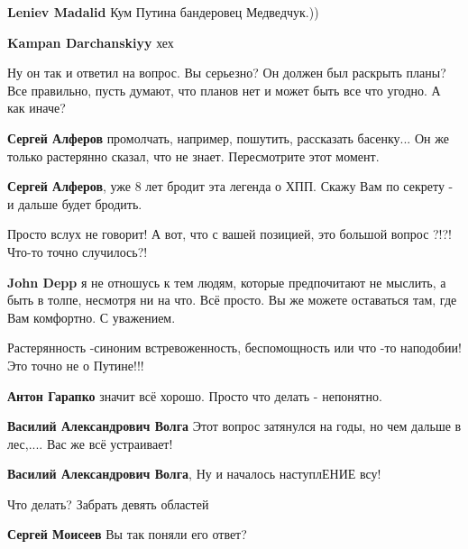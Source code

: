 \begin{itemize}
\begin{itemize} %
\textbf{Leniev Madalid} Кум Путина бандеровец Медведчук.))

\textbf{Kampan Darchanskiyy} хех
\end{itemize} %


Ну он так и ответил на вопрос. Вы серьезно? Он должен был раскрыть планы? Все
правильно, пусть думают, что планов нет и может быть все что угодно. А как
иначе?

\begin{itemize} %
\textbf{Сергей Алферов} промолчать, например, пошутить, рассказать басенку... Он же только растерянно сказал, что не знает. Пересмотрите этот момент.

\textbf{Сергей Алферов}, уже 8 лет бродит эта легенда о ХПП. Скажу Вам по секрету - и дальше будет бродить.
\end{itemize} %


Просто вслух не говорит! А вот, что с вашей позицией, это большой вопрос ?!?!
Что-то точно случилось?!

\begin{itemize} %
\textbf{John Depp} я не отношусь к тем людям, которые предпочитают не мыслить, а быть в толпе, несмотря ни на что. Всё просто. Вы же можете оставаться там, где Вам комфортно.
С уважением.
\end{itemize} %


Растерянность -синоним встревоженность, беспомощность или что -то наподобии!
Это точно не о Путине!!!

\begin{itemize} %
\textbf{Антон Гарапко} значит всё хорошо. Просто что делать - непонятно.

\textbf{Василий Александрович Волга}
Этот вопрос затянулся на годы, но чем дальше в лес,.... Вас же всё устраивает!

\textbf{Василий Александрович Волга}, Ну и началось наступлЕНИЕ всу!
\end{itemize} %

Что делать? Забрать девять областей

\begin{itemize} %
\textbf{Сергей Моисеев} Вы так поняли его ответ?


\end{itemize}
\end{itemize}
